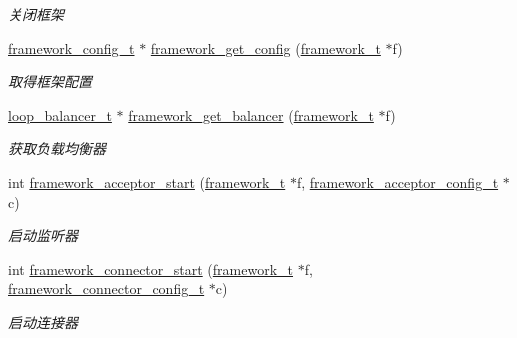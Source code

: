 \begin{DoxyCompactItemize}
\begin{DoxyCompactList}\small\item\em 关闭框架 \end{DoxyCompactList}\item 
\hyperlink{a00051_a55b26efa9e6ee05514d087ba2593a54b_a55b26efa9e6ee05514d087ba2593a54b}{framework\+\_\+config\+\_\+t} $\ast$ \hyperlink{a00103_gaf0524cc257c8e57ba11d676dcca6bf64_gaf0524cc257c8e57ba11d676dcca6bf64}{framework\+\_\+get\+\_\+config} (\hyperlink{a00051_a6149d769f6f07ed14a40a271c95d8463_a6149d769f6f07ed14a40a271c95d8463}{framework\+\_\+t} $\ast$f)
\begin{DoxyCompactList}\small\item\em 取得框架配置 \end{DoxyCompactList}\item 
\hyperlink{a00051_a649c7e850ab247b5f70ad27e335a129d_a649c7e850ab247b5f70ad27e335a129d}{loop\+\_\+balancer\+\_\+t} $\ast$ \hyperlink{a00052_a1cd41581680bc47f0d86d625fc3234ae_a1cd41581680bc47f0d86d625fc3234ae}{framework\+\_\+get\+\_\+balancer} (\hyperlink{a00051_a6149d769f6f07ed14a40a271c95d8463_a6149d769f6f07ed14a40a271c95d8463}{framework\+\_\+t} $\ast$f)
\begin{DoxyCompactList}\small\item\em 获取负载均衡器 \end{DoxyCompactList}\item 
int \hyperlink{a00103_ga53ad108c8d70f15e9d31408f0d2dece1_ga53ad108c8d70f15e9d31408f0d2dece1}{framework\+\_\+acceptor\+\_\+start} (\hyperlink{a00051_a6149d769f6f07ed14a40a271c95d8463_a6149d769f6f07ed14a40a271c95d8463}{framework\+\_\+t} $\ast$f, \hyperlink{a00051_a61a4e424ff4c86631423dedd97c40064_a61a4e424ff4c86631423dedd97c40064}{framework\+\_\+acceptor\+\_\+config\+\_\+t} $\ast$c)
\begin{DoxyCompactList}\small\item\em 启动监听器 \end{DoxyCompactList}\item 
int \hyperlink{a00103_ga4a6f0ed73c188faf4ed7e7d6050f6d5c_ga4a6f0ed73c188faf4ed7e7d6050f6d5c}{framework\+\_\+connector\+\_\+start} (\hyperlink{a00051_a6149d769f6f07ed14a40a271c95d8463_a6149d769f6f07ed14a40a271c95d8463}{framework\+\_\+t} $\ast$f, \hyperlink{a00051_a81253f4c995b97e69be0e67f7a26097f_a81253f4c995b97e69be0e67f7a26097f}{framework\+\_\+connector\+\_\+config\+\_\+t} $\ast$c)
\begin{DoxyCompactList}\small\item\em 启动连接器 \end{DoxyCompactList}\item 

\end{DoxyCompactItemize}
